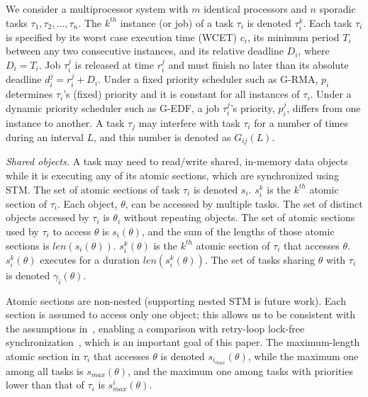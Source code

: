 \documentclass{sig-alternate}
\begin{document}
We consider a multiprocessor system with $m$ identical processors and $n$ sporadic tasks $\tau_1, \tau_2,\ldots, \tau_n$. The $k^{th}$ instance (or job) of a task $\tau_i$ is denoted $\tau_i^k$. Each task $\tau_i$ is specified by its worst case execution time (WCET) $c_i$, its minimum period $T_i$ between any two consecutive instances, and its relative deadline $D_i$, where $D_i=T_i$. Job $\tau_i^j$ is released at time $r_i^j$ and must finish no later than its absolute deadline $d_i^j=r_i^j+D_i$. Under a fixed priority scheduler such as G-RMA, $p_i$ determines $\tau_i$'s (fixed) priority and it is constant for all instances of $\tau_i$. Under a dynamic priority scheduler such as G-EDF, a job $\tau_i^j$'s priority, $p_i^j$, differs from one instance to another. 
A task $\tau_j$ may interfere with task $\tau_i$ for a number of times during an interval $L$, and this number is denoted as $G_{ij}(L)$. 


\textit{Shared objects.}
 A task may need to read/write shared, in-memory data objects while it is executing any of its atomic sections, which are synchronized using STM. 
The set of atomic sections of task $\tau_i$ is denoted $s_i$. $s_i^k$ is the $k^{th}$ atomic section of $\tau_i$. 
Each object, $\theta$, can be accessed by multiple tasks. The set of distinct objects accessed by $\tau_i$ is $\theta_i$ without repeating objects.
The set of atomic sections used by $\tau_i$ to access $\theta$ is $s_i(\theta)$, and the sum of the lengths of those atomic sections is $len(s_i(\theta))$. $s_i^k(\theta)$ is the $k^{th}$ atomic section of $\tau_i$ that accesses $\theta$. $s_i^k(\theta)$  executes for a duration $len(s_i^k(\theta))$.
The set of tasks sharing $\theta$ with $\tau_i$ is denoted $\gamma_i(\theta)$. 

Atomic sections are non-nested (supporting nested STM is future work). Each section is assumed to access only one object; this allows us to be consistent with the assumptions in~\cite{stmconcurrencycontrol:emsoft11}, enabling a comparison with retry-loop lock-free synchronization~\cite{key-5}, which is an important goal of this paper.
The maximum-length atomic section in $\tau_i$ that accesses $\theta$ is denoted $s_{i_{max}} (\theta)$, while the maximum one among all tasks is $s_{max} (\theta)$, and the maximum one among tasks with priorities lower than that of $\tau_i$ is $s_{max}^i (\theta)$.
\end{document}
